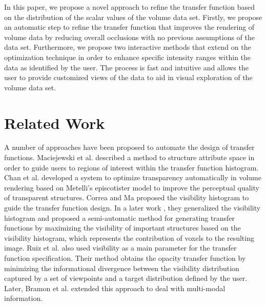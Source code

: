 In this paper, we propose a novel approach to refine the transfer function based on the distribution of the scalar values of the volume data set.
Firstly, we propose an automatic step to refine the transfer function that improves the rendering of volume data by reducing overall occlusions with no previous assumptions of the data set. Furthermore, we propose two interactive methods that extend on the optimization technique in order to enhance specific intensity ranges within the data as identified by the user. The process is fast and intuitive and allows the user to provide customized views of the data to aid in visual exploration of the volume data set.

\section{Related Work}
A number of approaches have been proposed to automate the design of transfer functions.
Maciejewski et al. \cite{maciejewski_structuring_2009} described a method to structure attribute space in order to guide users to regions of interest within the transfer function histogram.
Chan et al. \cite{chan_perception-based_2009} developed a system to optimize transparency automatically in volume rendering based on Metelli's episcotister model to improve the perceptual quality of transparent structures.
Correa and Ma \cite{correa_visibility-driven_2009} proposed the visibility histogram to guide the transfer function design. In a later work \cite{correa_visibility_2011}, they generalized the visibility histogram and proposed a semi-automatic method for generating transfer functions by maximizing the visibility of important structures based on the visibility histogram, which represents the contribution of voxels to the resulting image.
Ruiz et al. \cite{ruiz_automatic_2011} also used visibility as a main parameter for the transfer function specification. Their method obtains the opacity transfer function by minimizing the informational divergence between the visibility distribution captured by a set of viewpoints and a target distribution defined by the user. Later, Bramon et al. \cite{bramon_information_2013} extended this approach to deal with multi-modal information.

